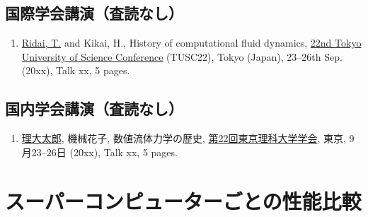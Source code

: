 \section*{国際学会講演（査読なし）}
\label{sec:app_kokusai}
\begin{enumerate}
    \item \underline{Ridai, T.} and Kikai, H., History of computational fluid dynamics, \href{https://xxxxxx}{22nd Tokyo University of Science Conference} (TUSC22), Tokyo (Japan), 23--26th Sep. (20xx), Talk xx, 5 pages.
\end{enumerate}

\section*{国内学会講演（査読なし）}
\label{sec:app_kokunai}
\begin{enumerate}
    \item \underline{理大太郎}, 機械花子, 数値流体力学の歴史, \href{https://xxxxxx}{第22回東京理科大学学会}, 東京, 9月23--26日 (20xx), Talk xx, 5 pages.
\end{enumerate}


\chapter{スーパーコンピューターごとの性能比較}
\label{ch:app_sx}

\lipsum[1-2]

